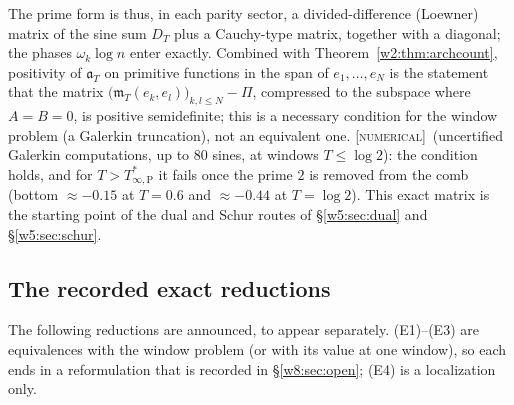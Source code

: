 \documentclass[11pt]{amsart}
\theoremstyle{definition}
\theoremstyle{remark}
\numberwithin{equation}{section}
\newcommand{\mT}{\mathfrak{m}_T}                       %
\newcommand{\aT}{\mathfrak{a}_T}                       %
\newcommand{\Tarch}{T^{*}_{\infty,\mathrm P}}          %
\newcommand{\stag}[1]{\textsc{[#1]}}
\newcommand{\NUM}{\stag{numerical}}
\begin{document}
The prime form is thus, in each parity sector, a divided-difference (Loewner) matrix of the sine sum $D_T$ plus a
Cauchy-type matrix, together with a diagonal; the phases $\omega_k\log n$ enter exactly. Combined with
Theorem~\ref{w2:thm:archcount}, positivity of $\aT$ on primitive functions in the span of $e_1,\dots,e_N$ is the
statement that the matrix $\bigl(\mT(e_k,e_l)\bigr)_{k,l\le N}-\Pi$, compressed to the subspace where $A=B=0$, is
positive semidefinite; this is a necessary condition for the window problem (a Galerkin truncation), not an equivalent
one. \NUM\ (uncertified Galerkin computations, up to $80$ sines, at windows $T\le\log2$): the condition holds, and for
$T>\Tarch$ it fails once the prime $2$ is removed from the comb (bottom $\approx-0.15$ at $T=0.6$ and $\approx-0.44$ at
$T=\log2$). This exact matrix is the
starting point of the dual and Schur routes of \S\ref{w5:sec:dual} and \S\ref{w5:sec:schur}.

\subsection{The recorded exact reductions}

The following reductions are announced, to appear separately. (E1)--(E3) are equivalences with the window problem (or with
its value at one window), so each ends in a reformulation that is recorded in \S\ref{w8:sec:open}; (E4) is a localization only.
\end{document}

